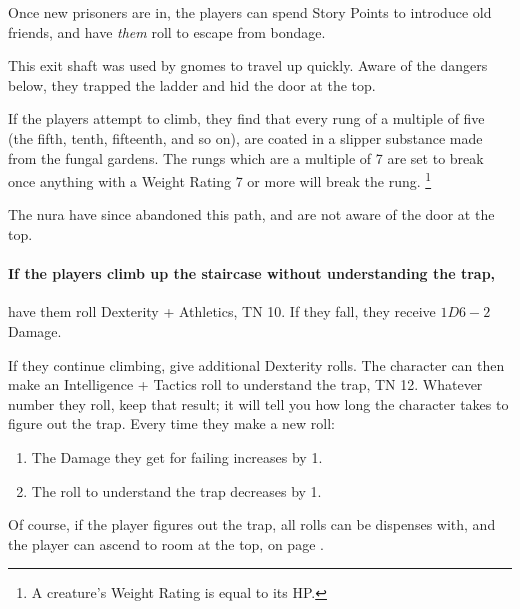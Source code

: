 \begin{multicols}{2}
Once new prisoners are in, the players can spend Story Points to introduce old friends, and have \textit{them} roll to escape from bondage.


\begin{exampletext}

	This exit shaft was used by gnomes to travel up quickly.
	Aware of the dangers below, they trapped the ladder and hid the door at the top.

\end{exampletext}

If the players attempt to climb, they find that every rung of a multiple of five (the fifth, tenth, fifteenth, and so on), are coated in a slipper substance made from the fungal gardens.
The rungs which are a multiple of 7 are set to break once anything with a Weight Rating 7 or more will break the rung.%
\footnote{A creature's Weight Rating is equal to its HP.}

The nura have since abandoned this path, and are not aware of the door at the top.

\paragraph{If the players climb up the staircase without understanding the trap,}
have them roll Dexterity + Athletics, TN 10.
If they fall, they receive $1D6-2$ Damage.

If they continue climbing, give additional Dexterity rolls.
The character can then make an Intelligence + Tactics roll to understand the trap, TN 12.
Whatever number they roll, keep that result; it will tell you how long the character takes to figure out the trap.
Every time they make a new roll:

\begin{enumerate}

	\item{The Damage they get for failing increases by 1.}
	\item{The roll to understand the trap decreases by 1.}

\end{enumerate}

Of course, if the player figures out the trap, all rolls can be dispenses with, and the player can ascend to room at the top, on page \pageref{laddertop}.


\begin{boxtext}


\end{boxtext}
\end{multicols}
